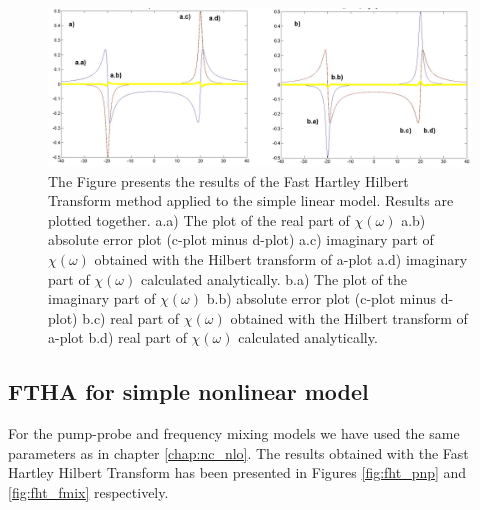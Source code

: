 \documentclass[12pt,twoside,a4paper]{article}
\numberwithin{equation}{subsection}
\numberwithin{figure}{subsection}
\begin{document}
\begin{figure} 
  \includegraphics[width=150mm]{img/fht_lin.png}
  \caption{The Figure presents the results of the Fast Hartley Hilbert Transform method applied to the simple linear
  model. Results are plotted together.
   a.a) The plot of the real part of $\chi (\omega )$ 
   a.b) absolute error plot (c-plot minus d-plot) 
   a.c) imaginary part of $\chi (\omega )$ obtained with the Hilbert transform of a-plot 
   a.d) imaginary part of $\chi (\omega )$  calculated analytically. 
   b.a) The plot of the imaginary part of $\chi (\omega )$ 
   b.b) absolute error plot (c-plot minus d-plot) 
   b.c) real part of $\chi (\omega )$ obtained with the Hilbert transform of a-plot 
   b.d) real part of $\chi (\omega )$ calculated analytically. \label{fig:fht_lin}
  }
\end{figure}

\subsection{FTHA for simple nonlinear model} \label{chap:hartley_nlo}

For the pump-probe and frequency mixing models we have used the same parameters as in chapter \ref{chap:nc_nlo}. The results
obtained with the Fast Hartley Hilbert Transform has been presented in Figures \ref{fig:fht_pnp} and \ref{fig:fht_fmix}
respectively.
\end{document}
